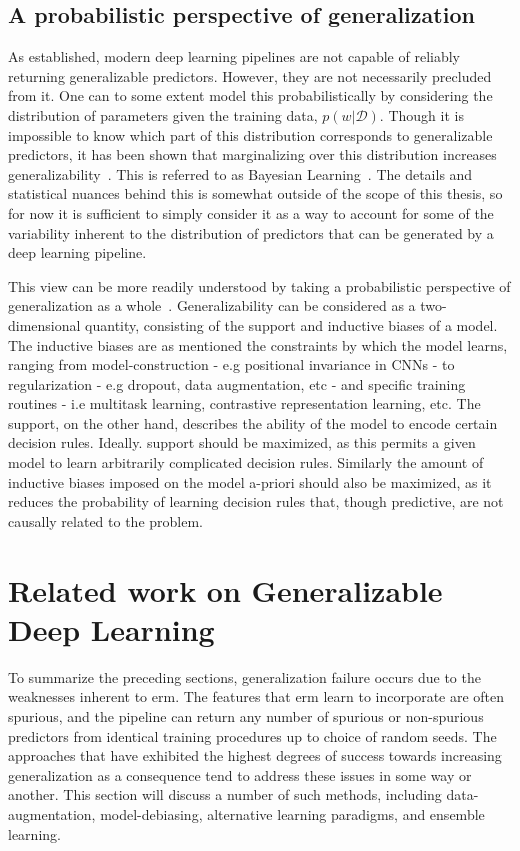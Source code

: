 	\subsection{A probabilistic perspective of generalization} \label{probpersp}
	As established, modern deep learning pipelines are not capable of reliably returning generalizable predictors. However, they are not necessarily precluded from it. One can to some extent model this probabilistically by considering the distribution of parameters given the training data, \(p(w | \mathcal{D})\). Though it is impossible to know which part of this distribution corresponds to generalizable predictors, it has been shown that marginalizing over this distribution increases generalizability~\cite{bayesian_generalization,endoensemble,divergentnets,ensemble_machinereading}. This is referred to as Bayesian Learning~\cite{bayesian_case}. The details and statistical nuances behind this is somewhat outside of the scope of this thesis, so for now it is sufficient to simply consider it as a way to account for some of the variability inherent to the distribution of predictors that can be generated by a deep learning pipeline. 

	This view can be more readily understood by taking a probabilistic perspective of generalization as a whole~\cite{bayesian_generalization}. Generalizability can be considered as a two-dimensional quantity, consisting of the support and inductive biases of a model. The inductive biases are as mentioned the constraints by which the model learns, ranging from model-construction - e.g positional invariance in CNNs - to regularization - e.g dropout, data augmentation, etc - and specific training routines - i.e multitask learning, contrastive representation learning, etc. The support, on the other hand, describes the ability of the model to encode certain decision rules. Ideally. support should be maximized, as this permits a given model to learn arbitrarily complicated decision rules. Similarly the amount of inductive biases imposed on the model a-priori should also be maximized, as it reduces the probability of learning decision rules that, though predictive, are not causally related to the problem. 

\section{Related work on Generalizable Deep Learning}
To summarize the preceding sections, generalization failure occurs due to the weaknesses inherent to \gls{erm}. The features that \gls{erm} learn to incorporate are often spurious, and the pipeline can return any number of spurious or non-spurious predictors from identical training procedures up to choice of random seeds. The approaches that have exhibited the highest degrees of success towards increasing generalization as a consequence tend to address these issues in some way or another. This section will discuss a number of such methods, including data-augmentation, model-debiasing, alternative learning paradigms, and ensemble learning.

